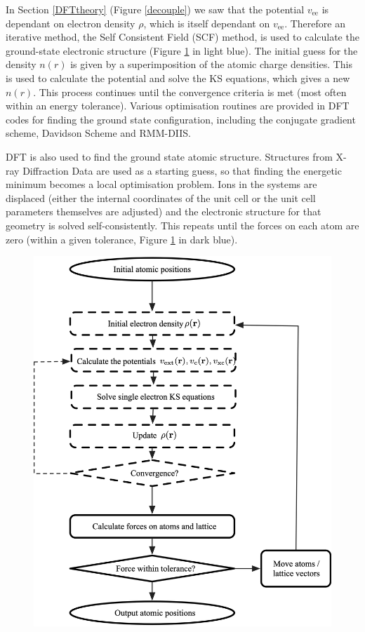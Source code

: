 In Section \ref{DFTtheory} (Figure \ref{decouple}) we saw that the potential $v_\textrm{ee}$ is dependant on electron density $\rho$, which is itself dependant on $v_\textrm{ee
}$. Therefore an iterative method, the Self Consistent Field (SCF) method, is used to calculate the ground-state electronic structure (Figure \ref{SCF} in light blue). The initial guess for the density $n(r)$ is given by a superimposition of the atomic charge densities. This is used to calculate the potential and solve the KS equations, which gives a new $n(r)$. This process continues until the convergence criteria is met (most often within an energy tolerance). Various optimisation routines are provided in DFT codes for finding the ground state configuration, including the conjugate gradient scheme, Davidson Scheme and RMM-DIIS.

DFT is also used to find the ground state atomic structure. Structures from X-ray Diffraction Data are used as a starting guess, so that finding the energetic minimum becomes a local optimisation problem. Ions in the systems are displaced (either the internal coordinates of the unit cell or the unit cell parameters themselves are adjusted) and the electronic structure for that geometry is solved self-consistently. This repeats until the forces on each atom are zero (within a given tolerance, Figure \ref{SCF} in dark blue). 

\begin{figure}[h]
\centering
  \includegraphics[width=1.0\columnwidth]{figures/ch3/scf.png}
  \caption[]{} 
  \label{SCF}
\end{figure}


